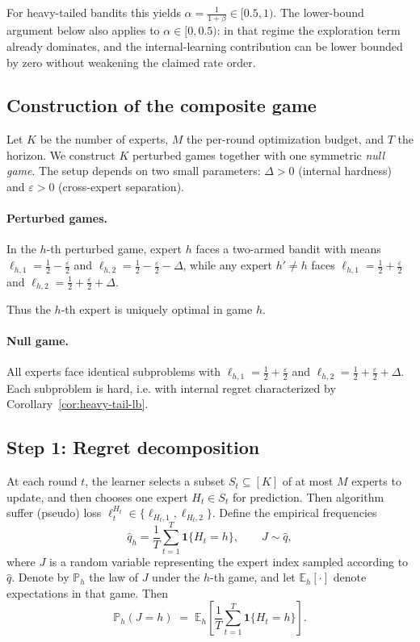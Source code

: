 \documentclass[a4paper,14pt]{extarticle}
\theoremstyle{plain}
\begin{document}
For heavy-tailed bandits this yields $\alpha=\tfrac{1}{1+\beta}\in[0.5,1)$. The lower-bound argument below also applies to $\alpha\in[0,0.5)$: in that regime the exploration term already dominates, and the internal-learning contribution can be lower bounded by zero without weakening the claimed rate order.

\subsection{Construction of the composite game}

Let $K$ be the number of experts, $M$ the per-round optimization budget, and $T$ the horizon.
We construct $K$ perturbed games together with one symmetric \emph{null game}.
The setup depends on two small parameters: $\Delta>0$ (internal hardness) and $\varepsilon>0$ (cross-expert separation).

\paragraph{Perturbed games.}
In the $h$-th perturbed game, expert $h$ faces a two-armed bandit with
means $\ell_{h, 1} = \tfrac{1}{2} - \tfrac{\varepsilon}{2}$ and $\ell_{h, 2} = \tfrac{1}{2} - \tfrac{\varepsilon}{2}- \Delta$,
while any expert $h'\neq h$ faces $\ell_{h, 1} = \tfrac{1}{2} + \tfrac{\varepsilon}{2}$ and $\ell_{h, 2} = \tfrac{1}{2} + \tfrac{\varepsilon}{2} + \Delta$.

Thus the $h$-th expert is uniquely optimal in game $h$.

\paragraph{Null game.}
All experts face identical subproblems with
$\ell_{h, 1} = \tfrac{1}{2} + \tfrac{\varepsilon}{2}$ and $\ell_{h, 2} = \tfrac{1}{2} + \tfrac{\varepsilon}{2} + \Delta$.
Each subproblem is hard, i.e. with internal regret characterized by Corollary~\ref{cor:heavy-tail-lb}.

\subsection{Step 1: Regret decomposition}

At each round $t$, the learner selects a subset $S_t \subseteq [K]$ of at most $M$ experts to update, and then chooses one expert $H_t \in S_t$ for prediction. Then algorithm suffer (pseudo) loss $\ell_t^{H_t} \in \{\ell_{H_t, 1}, \ell_{H_t, 2}\}$. Define the empirical frequencies
\begin{equation}
\hat q_h = \frac{1}{T}\sum_{t=1}^T \mathbf{1}\{H_t = h\},
\qquad
J \sim \hat q,
\end{equation}
where $J$ is a random variable representing the expert index sampled according to $\hat q$.
Denote by $\mathbb{P}_h$ the law of $J$ under the $h$-th game, and let $\mathbb{E}_h[\cdot]$ denote expectations in that game.
Then
\begin{equation}
\mathbb{P}_h(J = h)
\;=\;
\mathbb{E}_h\!\left[\frac{1}{T}\sum_{t=1}^T \mathbf{1}\{H_t = h\}\right].
\end{equation}
\end{document}
